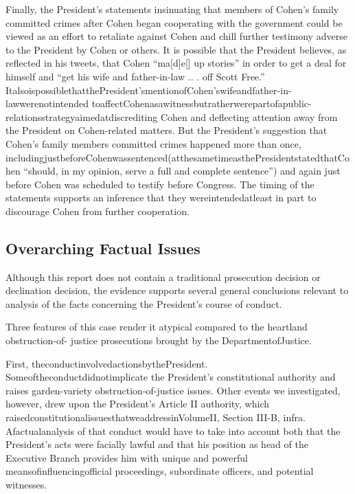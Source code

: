 {Finally, the President's statements insinuating that members of Cohen's family committed crimes after Cohen began cooperating with the government could be viewed as an effort to retaliate against Cohen and chill further testimony adverse to the President by Cohen or others. It is possible that the President believes, as reflected in his tweets, that Cohen “ma[d]e[] up stories” in order to get a deal for himself and “get his wife and father-in-law .. . off Scott Free.” ItalsoispossiblethatthePresident'smentionofCohen'swifeandfather-in-lawwerenotintended toaffectCohenasawitnessbutratherwerepartofapublic-relationsstrategyaimedatdiscrediting Cohen and deflecting attention away from the President on Cohen-related matters. But the President's suggestion that Cohen's family members committed crimes happened more than once, includingjustbeforeCohenwassentenced(atthesametimeasthePresidentstatedthatCohen “should, in my opinion, serve a full and complete sentence”) and again just before Cohen was scheduled to testify before Congress. The timing of the statements supports an inference that they wereintendedatleast in part to discourage Cohen from further cooperation.

\subsection{Overarching Factual Issues}

Although this report does not contain a traditional prosecution decision or declination decision, the evidence supports several general conclusions relevant to analysis of the facts concerning the President's course of conduct.

Three features of this case render it atypical compared to the heartland obstruction-of- justice prosecutions brought by the DepartmentofJustice.

First, theconductinvolvedactionsbythePresident. Someoftheconductdidnotimplicate the President's constitutional authority and raises garden-variety obstruction-of-justice issues. Other events we investigated, however, drew upon the President's Article II authority, which raisedconstitutionalissuesthatweaddressinVolumeII, Section III-B, infra. Afactualanalysis of that conduct would have to take into account both that the President's acts were facially lawful and that his position as head of the Executive Branch provides him with unique and powerful meansofinfluencingofficial proceedings, subordinate officers, and potential witnesses.

}
